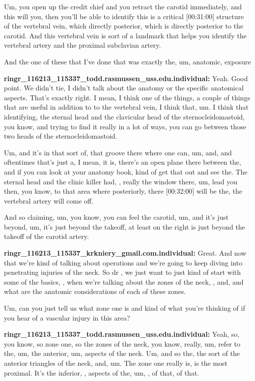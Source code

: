 \documentclass[
]{book}
\begin{document}
Um, you open up the credit chief and you retract the carotid
immediately, and this will you, then you'll be able to identify this is
a critical {[}00:31:00{]} structure of the vertebral vein, which directly
posterior, which is directly posterior to the carotid. And this
vertebral vein is sort of a landmark that helps you identify the
vertebral artery and the proximal subclavian artery.

And the one of these that I've done that was exactly the, um, anatomic,
exposure

\textbf{ringr\_116213\_115337\_todd.rasmussen\_uss.edu.individual:} Yeah. Good
point. We didn't tie, I didn't talk about the anatomy or the specific
anatomical aspects. That's exactly right. I mean, I think one of the
things, a couple of things that are useful in addition to to the
vertebral vein, I think that, um. I think that identifying, the sternal
head and the clavicular head of the sternocleidomastoid, you know, and
trying to find it really in a lot of ways, you can go between those two
heads of the sternocleidomastoid.

Um, and it's in that sort of, that groove there where one can, um, and,
and oftentimes that's just a, I mean, it is, there's an open plane there
between the, and if you can look at your anatomy book, kind of get that
out and see the. The sternal head and the clinic killer had, , really
the window there, um, lead you then, you know, to that area where
posteriorly, there {[}00:32:00{]} will be the, the vertebral artery will
come off.

And so claiming, um, you know, you can feel the carotid, um, and it's
just beyond, um, it's just beyond the takeoff, at least on the right is
just beyond the takeoff of the carotid artery.

\textbf{ringr\_116213\_115337\_krkniery\_gmail.com.individual:} Great. And now
that we're kind of talking about operations and we're going to keep
diving into penetrating injuries of the neck. So dr , we just want to
just kind of start with some of the basics, , when we're talking about
the zones of the neck, , and, and what are the anatomic considerations
of each of these zones.

Um, can you just tell us what zone one is and kind of what you're
thinking of if you hear of a vascular injury in this area?

\textbf{ringr\_116213\_115337\_todd.rasmussen\_uss.edu.individual:} Yeah, so, you
know, so zone one, so the zones of the neck, you know, really, um, refer
to the, um, the anterior, um, aspects of the neck. Um, and so the, the
sort of the anterior triangles of the neck, and, um. The zone one really
is, is the most proximal. It's the inferior, , aspects of the, um, , of
that, of that.
\end{document}
